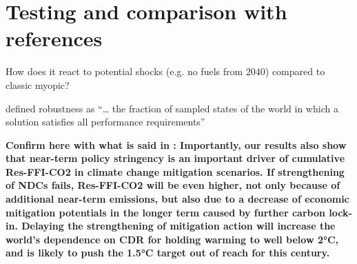 \section{Testing and comparison with references}
\label{sec:RL:testing}

How does it react to potential shocks (e.g. no fuels from 2040) compared to classic myopic?

\citet{herman2014beyond} defined robustness as ``… the fraction of sampled states of the world in which a solution satisfies all performance requirements''

%

%



\textbf{Confirm here with what is said in \cite{luderer2018residual}: 
Importantly, our results also show that near-term policy stringency is an important driver of cumulative Res-FFI-CO2 in climate change mitigation scenarios. If strengthening of NDCs fails, Res-FFI-CO2 will be even higher, not only because of additional near-term emissions, but also due to a decrease of economic mitigation potentials in the longer term caused by further carbon lock-in. Delaying the strengthening of mitigation action will increase the world’s dependence on CDR for holding warming to well below 2°C, and is likely to push the 1.5°C target out of reach for this century.}


